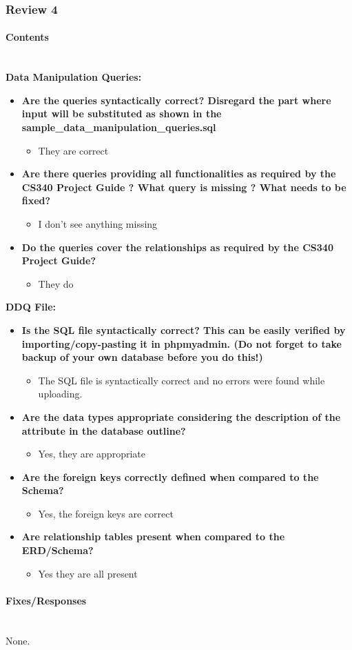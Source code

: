 \documentclass[12pt]{article}
\newcommand{\hparagraph}[1]{\paragraph{#1}\mbox{}\vspace{0.75em}\\}
\begin{document}
\begin{appendices}
\newpage
\subsubsection{Review 4}
\hparagraph{Contents}
\textbf{Data Manipulation Queries:}
\begin{itemize}
    \item \textbf{Are the queries syntactically correct? Disregard the part where input will be substituted as shown in the sample\_data\_manipulation\_queries.sql}
    \begin{itemize}
        \item They are correct
    \end{itemize}
    \item \textbf{Are there queries providing all functionalities as required by the CS340 Project Guide ? What query is missing ? What needs to be fixed?}
    \begin{itemize}
        \item I don't see anything missing
    \end{itemize}
    \item \textbf{Do the queries cover the relationships as required by the CS340 Project Guide?}
    \begin{itemize}
        \item They do
    \end{itemize}
\end{itemize}
\textbf{DDQ File:}
\begin{itemize}
    \item \textbf{Is the SQL file syntactically correct? This can be easily verified by importing/copy-pasting it in phpmyadmin. (Do not forget to take backup of your own database before you do this!)}
    \begin{itemize}
        \item The SQL file is syntactically correct and no errors were found while uploading.
    \end{itemize}
    \item \textbf{Are the data types appropriate considering the description of the attribute in the database outline?}
    \begin{itemize}
        \item Yes, they are appropriate
    \end{itemize}
    \item \textbf{Are the foreign keys correctly defined when compared to the Schema?}
    \begin{itemize}
        \item Yes, the foreign keys are correct
    \end{itemize}
    \item \textbf{Are relationship tables present when compared to the ERD/Schema?}
    \begin{itemize}
        \item Yes they are all present
    \end{itemize}
\end{itemize}
\hparagraph{Fixes/Responses}
None.

\end{appendices}
\end{document}
